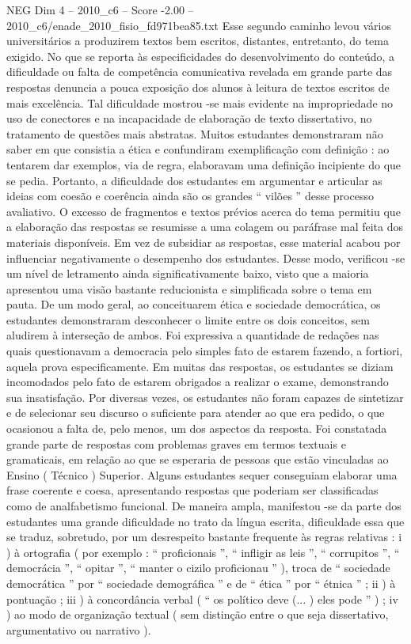 \begin{textsample}{NEG Dim 4 – 2010\_c6 – Score -2.00 – 2010\_c6/enade\_2010\_fisio\_fd971bea85.txt}
Esse segundo caminho levou vários universitários a produzirem textos bem escritos, distantes, entretanto, do tema exigido.
No que se reporta às especificidades do desenvolvimento do conteúdo, a dificuldade ou falta de competência comunicativa revelada em grande parte das respostas denuncia a pouca exposição dos alunos à leitura de textos escritos de mais excelência.
Tal dificuldade mostrou -se mais evidente na impropriedade no uso de conectores e na incapacidade de elaboração de texto dissertativo, no tratamento de questões mais abstratas.
Muitos estudantes demonstraram não saber em que consistia a ética e confundiram exemplificação com definição : ao tentarem dar exemplos, via de regra, elaboravam uma definição incipiente do que se pedia.
Portanto, a dificuldade dos estudantes em argumentar e articular as ideias com coesão e coerência ainda são os grandes “ vilões ” desse processo avaliativo.
O excesso de fragmentos e textos prévios acerca do tema permitiu que a elaboração das respostas se resumisse a uma colagem ou paráfrase mal feita dos materiais disponíveis.
Em vez de subsidiar as respostas, esse material acabou por influenciar negativamente o desempenho dos estudantes.
Desse modo, verificou -se um nível de letramento ainda significativamente baixo, visto que a maioria apresentou uma visão bastante reducionista e simplificada sobre o tema em pauta.
De um modo geral, ao conceituarem ética e sociedade democrática, os estudantes demonstraram desconhecer o limite entre os dois conceitos, sem aludirem à interseção de ambos.
Foi expressiva a quantidade de redações nas quais questionavam a democracia pelo simples fato de estarem fazendo, a fortiori, aquela prova especificamente.
Em muitas das respostas, os estudantes se diziam incomodados pelo fato de estarem obrigados a realizar o exame, demonstrando sua insatisfação.
Por diversas vezes, os estudantes não foram capazes de sintetizar e de selecionar seu discurso o suficiente para atender ao que era pedido, o que ocasionou a falta de, pelo menos, um dos aspectos da resposta.
Foi constatada grande parte de respostas com problemas graves em termos textuais e gramaticais, em relação ao que se esperaria de pessoas que estão vinculadas ao Ensino ( Técnico ) Superior.
Alguns estudantes sequer conseguiam elaborar uma frase coerente e coesa, apresentando respostas que poderiam ser classificadas como de analfabetismo funcional.
De maneira ampla, manifestou -se da parte dos estudantes uma grande dificuldade no trato da língua escrita, dificuldade essa que se traduz, sobretudo, por um desrespeito bastante frequente às regras relativas : i ) à ortografia ( por exemplo : “ proficionais ”, “ infligir as leis ”, “ corrupitos ”, “ democrácia ”, “ opitar ”, “ manter o cizilo proficionau ” ), troca de “ sociedade democrática ” por “ sociedade demográfica ” e de “ ética ” por “ étnica ” ; ii ) à pontuação ; iii ) à concordância verbal ( “ os político deve (... ) eles pode ” ) ; iv ) ao modo de organização textual ( sem distinção entre o que seja dissertativo, argumentativo ou narrativo ).

\end{textsample}
